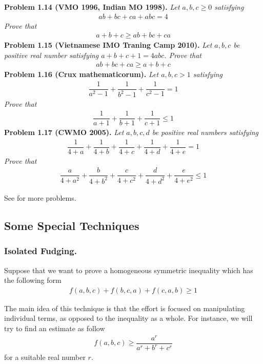 \documentclass[a4paper,oneside]{article}
\numberwithin{equation}{section}
\begin{document}
\textbf{Problem 1.14 (VMO 1996, Indian MO 1998).} \textit{Let $a,b,c \ge 0$ satisfying}
\begin{align}
ab+bc+ca+abc=4
\end{align}
\textit{Prove that}
\begin{align}
a+b+c \ge ab+bc+ca
\end{align}
\textbf{Problem 1.15 (Vietnamese IMO Traning Camp 2010).} \textit{Let $a,b,c$ be positive real number satisfying $a+b+c+1=4abc$. Prove that}
\begin{align}
ab+bc+ca \ge a+b+c
\end{align}
\textbf{Problem 1.16 (Crux  mathematicorum).} \textit{Let $a,b,c>1$ satisfying}
\begin{align}
\dfrac{1}{{{a^2} - 1}} + \dfrac{1}{{{b^2} - 1}} + \dfrac{1}{{{c^2} - 1}} = 1
\end{align}
\textit{Prove that}
\begin{align}
\dfrac{1}{{a + 1}} + \dfrac{1}{{b + 1}} + \dfrac{1}{{c + 1}} \le 1
\end{align}
\textbf{Problem 1.17 (CWMO 2005).} \textit{Let $a,b,c,d$ be positive real numbers satisfying}
\begin{align}
\dfrac{1}{{4 + a}} + \dfrac{1}{{4 + b}} + \dfrac{1}{{4 + c}} + \dfrac{1}{{4 + d}} + \dfrac{1}{{4 + e}} = 1
\end{align}
\textit{Prove that}
\begin{align}
\dfrac{a}{{4 + {a^2}}} + \dfrac{b}{{4 + {b^2}}} + \dfrac{c}{{4 + {c^2}}} + \dfrac{d}{{4 + {d^2}}} + \dfrac{e}{{4 + {e^2}}} \le 1
\end{align}

See \cite{1} for more problems.
\subsection{Some Special Techniques}
\subsubsection{Isolated Fudging.} Suppose that we want to prove a homogeneous symmetric inequality which has the following form
\begin{align}
\label{1.24}
f\left( {a,b,c} \right) + f\left( {b,c,a} \right) + f\left( {c,a,b} \right) \ge 1
\end{align}

The main idea of this technique is that the effort is focused on manipulating individual terms, as opposed to the inequality as a whole. For instance, we will try to find an estimate as follow
\begin{align}
\label{1.25}
f\left( {a,b,c} \right) \ge \dfrac{{{a^r}}}{{{a^r} + {b^r} + {c^r}}}
\end{align}
for a suitable real number $r$. 
\end{document}
